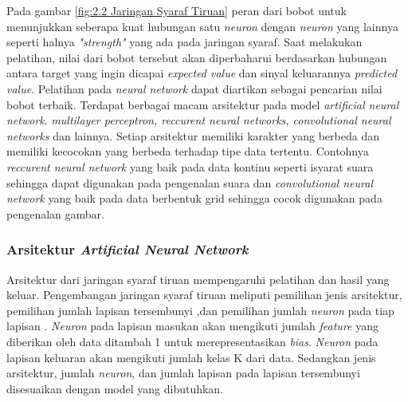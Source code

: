 Pada gambar \ref{fig:2.2 Jaringan Syaraf Tiruan} peran dari bobot untuk menunjukkan seberapa kuat hubungan satu \textit{neuron} dengan \textit{neuron} yang lainnya seperti halnya \textit{"strength"} yang ada pada jaringan syaraf. Saat melakukan pelatihan, nilai dari bobot tersebut akan diperbaharui berdasarkan hubungan antara target yang ingin dicapai \textit{expected value} dan sinyal keluarannya \textit{predicted value}. Pelatihan pada \textit{neural network} dapat diartikan sebagai pencarian nilai bobot terbaik\cite{Kelleher2019-cj}. Terdapat berbagai macam arsitektur pada model \textit{artificial neural network}. \textit{multilayer perceptron, reccurent neural networks, convolutional neural networks} dan lainnya. Setiap arsitektur memiliki karakter yang berbeda dan memiliki kecocokan yang berbeda terhadap tipe data tertentu. Contohnya \textit{reccurent neural network} yang baik pada data kontinu seperti isyarat suara sehingga dapat digunakan pada pengenalan suara dan \textit{convolutional neural network} yang baik pada data berbentuk grid sehingga cocok digunakan pada pengenalan gambar.

\subsubsection{Arsitektur \textit{Artificial Neural Network}}

Arsitektur dari jaringan syaraf tiruan mempengaruhi pelatihan dan hasil yang keluar. Pengembangan jaringan syaraf tiruan meliputi pemilihan jenis arsitektur, pemilihan jumlah lapisan tersembunyi ,dan pemilihan jumlah \textit{neuron} pada tiap lapisan \cite{Kelleher2019-cj}. \textit{Neuron} pada lapisan masukan akan mengikuti jumlah \textit{feature} yang diberikan oleh data ditambah 1 untuk merepresentasikan \textit{bias}. \textit{Neuron} pada lapisan keluaran akan mengikuti jumlah kelas K dari data. Sedangkan jenis arsitektur, jumlah \textit{neuron}, dan jumlah lapisan pada lapisan tersembunyi disesuaikan dengan model yang dibutuhkan.

